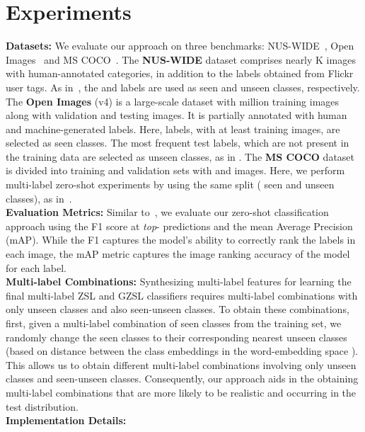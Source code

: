 \documentclass[10pt,journal,compsoc]{IEEEtran}
\begin{document}
\section{Experiments}

\noindent\textbf{Datasets:} We evaluate our approach on three benchmarks: NUS-WIDE~\cite{nuswide}, Open Images~\cite{openimages} and MS COCO~\cite{coco}.
The \textbf{NUS-WIDE} dataset comprises nearly K images with  human-annotated categories, in addition to the  labels obtained from Flickr user tags. As in~\cite{huynh2020shared,zhang2016fast}, the  and  labels are used as seen and unseen classes, respectively. 
The \textbf{Open Images} (v4) is a large-scale dataset with  million training images along with  validation and  testing images. 
It is partially annotated with human and machine-generated labels. Here,  labels, with at least  training images, are selected as seen classes. The most frequent  test labels, which are not present in the training data are selected as unseen classes, as in \cite{huynh2020shared}. 
The \textbf{MS COCO} dataset is divided into training and validation sets with  and  images. Here, we perform multi-label zero-shot experiments by using the same split ( seen and  unseen classes), as in~\cite{bansal2018zero,hayat2020synthesizing}.\\
\noindent\textbf{Evaluation Metrics:}
Similar to~\cite{huynh2020shared,veit2017learning}, we evaluate our zero-shot classification approach using the F1 score at \textit{top}- predictions and the mean Average Precision (mAP). While the F1 captures the model's ability to correctly rank the labels in each image, the mAP metric captures the image ranking accuracy of the model for each label.\\
\noindent\textbf{Multi-label Combinations:} Synthesizing multi-label features for learning the final multi-label ZSL and GZSL classifiers requires multi-label combinations with only unseen classes and also seen-unseen classes. 
To obtain these combinations, first, given a multi-label combination of seen classes from the training set, we randomly change the seen classes to their corresponding nearest unseen classes (based on distance between the class embeddings in the word-embedding space ). This allows us to obtain different multi-label combinations involving only unseen classes and seen-unseen classes.  Consequently, our approach aids in the obtaining multi-label combinations that are more likely to be realistic and occurring in the test distribution.\\
\noindent\textbf{Implementation Details:}
\end{document}
